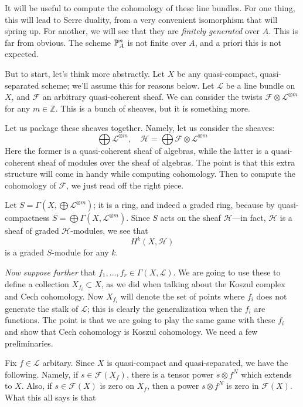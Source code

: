 \documentclass{article}
\begin{document}
It will be useful to compute the cohomology of these line bundles. For one
thing, this will lead to Serre duality, from a very convenient isomorphism that
will spring up. For another, we will see that they are \emph{finitely
generated} over $A$. This is far from obvious. The scheme  $\P^n_A$ is not
finite over $A$, and a priori this is not expected.

But to start, let's think more abstractly. Let $X$ be any quasi-compact,
quasi-separated scheme; we'll assume this for reasons below. Let $\mathcal{L}$
be a line bundle on $X$, and $\mathcal{F}$ an arbitrary quasi-coherent sheaf.
We can consider the twists $\mathcal{F} \otimes \mathcal{L}^{\otimes m}$ for any $m \in
\mathbb{Z}$. This is a bunch of sheaves, but it is something more. 

Let us package these sheaves together. Namely, let us consider the sheaves:
\[ \bigoplus \mathcal{L}^{\otimes m}, \quad \mathcal{H}=\bigoplus \mathcal{F} \otimes \mathcal{L}^{\otimes m}  \]
Here the former is a quasi-coherent sheaf of algebras, while the latter is a
quasi-coherent sheaf of modules over the sheaf of algebras. The point is that
this extra structure will come in handy while computing cohomology. 
Then to compute the cohomology of $\mathcal{F}$, we just read off the right
piece. 

Let $S = \Gamma(X, \bigoplus \mathcal{L}^{\otimes m})$; it is a ring, and indeed a
graded ring, because by quasi-compactness $S =\bigoplus \Gamma(X, \mathcal{L}^{\otimes
m})$. 
Since $S$ acts on the sheaf $\mathcal{H}$---in fact, $\mathcal{H}$ is a sheaf
of graded $\mathcal{H}$-modules, we see that 
\[ H^k(X,\mathcal{H})  \]
is a graded $S$-module for any $k$. 

\emph{Now suppose further} that $f_1, \dots, f_r \in \Gamma(X, \mathcal{L})$. We are
going to use these to define a collection $X_{f_i} \subset X$, as we did when
talking about the Koszul complex and Cech cohomology.
Now $X_{f_i}$ will denote the set of points where $f_i$ does not generate the
stalk of $\mathcal{L}$; this is clearly the generalization when the $f_i$ are functions.
The point is that we are going to play the same game with these $f_i$ and show
that Cech cohomology is Koszul cohomology.
We need a few preliminaries. 

Fix $f \in \mathcal{L}$ arbitary.
Since $X$ is
quasi-compact and quasi-separated, we have the following. Namely, if $s \in
\mathcal{F}(X_f)$, there is a tensor power $s \otimes f^N$ which extends to
$X$. Also, if $s \in \mathcal{F}(X)$ is zero on $X_f$, then a power $s \otimes
f^N$ is zero in $\mathcal{F}(X)$.
What this all says is that
\end{document}
